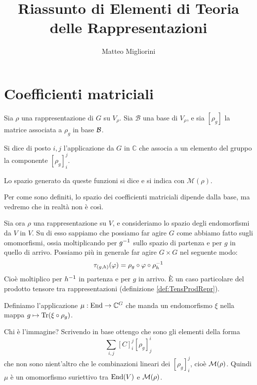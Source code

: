 \documentclass[a4paper,10pt,oneside]{math_article}
\title{Riassunto di Elementi di Teoria delle Rappresentazioni}
\author{Matteo Migliorini}
\date{}
\renewcommand{\phi}{\varphi}
\newcommand{\func}[2][\bC]{#1^{#2}}
\begin{document}
 
 
 \maketitle
 
 \cleardoublepage	
 
 \cleardoublepage
 \tableofcontents
 \cleardoublepage
 
 
 
 
 
 
 
 

  \section{Coefficienti matriciali}
    \begin{mydef}
     Sia $\rho$ una rappresentazione di $G$ su $V_\rho$. Sia $\mathcal B$ una base di $V_\rho$, e sia $[\rho_g]$ la matrice associata a $\rho_g$ in base $\mathcal B$.
     
     Si dice  di posto $i,j$ l'applicazione da $G$ in $\mathbb C$ che associa a un elemento del gruppo la componente $[\rho_g]_i^j$.
     
     Lo spazio generato da queste funzioni si dice  e si indica con $\mathcal M(\rho)$.
    \end{mydef}
    
    Per come sono definiti, lo spazio dei coefficienti matriciali dipende dalla base, ma vedremo che in realtà non è così.
    
    Sia ora $\rho$ una rappresentazione su $V$, e consideriamo lo spazio degli endomorfismi da $V$ in $V$. Su di esso sappiamo che possiamo far agire $G$ come abbiamo fatto sugli omomorfismi, ossia moltiplicando per $g^{-1}$ sullo spazio di partenza e per $g$ in quello di arrivo. Possiamo più in generale far agire $G\times G$ nel seguente modo:
    \[
     \tau_{(g,h)} (\phi) = \rho_g \circ \phi \circ \rho_h\inv
    \]
		Cioè moltiplico per $h^{-1}$ in partenza e per $g$ in arrivo. \`E un caso particolare del prodotto tensore tra rappresentazioni (definizione \ref{def:TensProdRepr}).
		
		Definiamo l'applicazione $\mu: \End \rar \func G$ che manda un endomorfismo $\xi$ nella mappa $g\mapsto \operatorname{Tr}(\xi\circ\rho_g)$.

		Chi è l'immagine? Scrivendo in base ottengo che sono gli elementi della forma
		\[
			\sum_{i,j} [C]_i^j[\rho_g]_j^i
		\]
		che non sono nient'altro che le combinazioni lineari dei $[\rho_g]_i^j$, cioè $\mathcal M(\rho)$. Quindi $\mu$ è un omomorfismo suriettivo tra $\operatorname{End}(V)$ e $\mathcal M(\rho)$.
		
\end{document}
